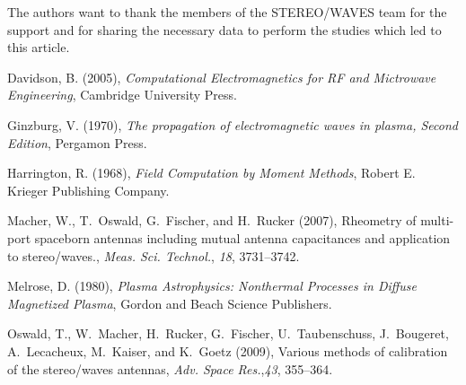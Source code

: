 \documentclass[two-coloumn,ras]{agutex}
\begin{document}
\begin{article}
\begin{acknowledgments}
The authors want to thank the members of the STEREO/WAVES team for the support and for sharing the necessary data to perform the studies which led to this article.
\end{acknowledgments}

%
%
%
%
%
%
%
%
%
%

\begin{thebibliography}{}
Davidson, B. (2005), \textit{Computational Electromagnetics for RF and
  Mictrowave Engineering}, Cambridge University Press.

Ginzburg, V. (1970), \textit{The propagation of electromagnetic waves in
  plasma, Second Edition}, Pergamon Press.

Harrington, R. (1968), \textit{Field Computation by Moment Methods}, Robert E.
  Krieger Publishing Company.

Macher, W., T.~Oswald, G.~Fischer, and H.~Rucker (2007), Rheometry of
  multi-port spaceborn antennas including mutual antenna capacitances and
  application to stereo/waves., \textit{Meas. Sci. Technol.}, \textit{18},
  3731--3742.

Melrose, D. (1980), \textit{Plasma Astrophysics: Nonthermal Processes in
  Diffuse Magnetized Plasma}, Gordon and Beach Science Publishers.

Oswald, T., W.~Macher, H.~Rucker, G.~Fischer, U.~Taubenschuss, J.~Bougeret,
  A.~Lecacheux, M.~Kaiser, and K.~Goetz (2009), Various methods of calibration
  of the stereo/waves antennas, \textit{Adv. Space Res.},\textit{43},
  355--364.


\end{thebibliography}
\end{article}
\end{document}
